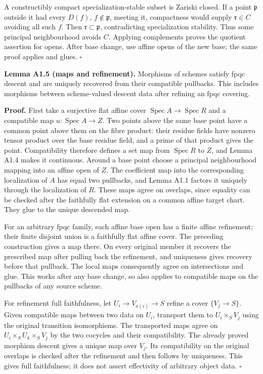 \documentclass[11pt,a4paper,openany]{report}
\begin{document}
A constructibly compact specialization-stable subset is Zariski closed. If a point \(\mathfrak p\) outside it had every \(D(f)\), \(f\notin\mathfrak p\), meeting it, compactness would supply \(\mathfrak r\in C\) avoiding all such \(f\). Then \(\mathfrak r\subset\mathfrak p\), contradicting specialization stability. Thus some principal neighbourhood avoids \(C\). Applying complements proves the quotient assertion for opens. After base change, use affine opens of the new base; the same proof applies and glues. \(\square\)

\textbf{Lemma A1.5 (maps and refinement).} Morphisms of schemes satisfy fpqc descent and are uniquely recovered from their compatible pullbacks. This includes morphisms between scheme-valued descent data after refining an fpqc covering.

\textbf{Proof.} First take a surjective flat affine cover \(\operatorname{Spec}A\to\operatorname{Spec}R\) and a compatible map \(u:\operatorname{Spec}A\to Z\). Two points above the same base point have a common point above them on the fibre product: their residue fields have nonzero tensor product over the base residue field, and a prime of that product gives the point. Compatibility therefore defines a set map from \(\operatorname{Spec}R\) to \(Z\), and Lemma A1.4 makes it continuous. Around a base point choose a principal neighbourhood mapping into an affine open of \(Z\). The coefficient map into the corresponding localization of \(A\) has equal two pullbacks, and Lemma A1.1 factors it uniquely through the localization of \(R\). These maps agree on overlaps, since equality can be checked after the faithfully flat extension on a common affine target chart. They glue to the unique descended map.

For an arbitrary fpqc family, each affine base open has a finite affine refinement; their finite disjoint union is a faithfully flat affine cover. The preceding construction gives a map there. On every original member it recovers the prescribed map after pulling back the refinement, and uniqueness gives recovery before that pullback. The local maps consequently agree on intersections and glue. This works after any base change, so also applies to compatible maps on the pullbacks of any source scheme.

For refinement full faithfulness, let \(U_i\to V_{a(i)}\to S\) refine a cover \(\{V_j\to S\}\). Given compatible maps between two data on \(U_i\), transport them to \(U_i\times_S V_j\) using the original transition isomorphisms. The transported maps agree on \(U_i\times_S U_k\times_S V_j\) by the two cocycles and their compatibility. The already proved morphism descent gives a unique map over \(V_j\). Its compatibility on the original overlaps is checked after the refinement and then follows by uniqueness. This gives full faithfulness; it does not assert effectivity of arbitrary object data. \(\square\)
\end{document}
